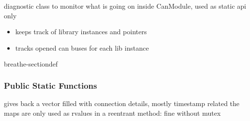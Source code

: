 \documentclass[a4paper,10pt,english]{sphinxmanual}
\begin{document}
\begin{fulllineitems}
\label{\detokenize{classesdetails:_CPPv4N9CanModule4DiagE}}%
\pysigstartmultiline
{}%
\pysigstopmultiline
\sphinxAtStartPar
diagnostic class to monitor what is going on inside CanModule, used as static api only\begin{itemize}
\item {} 
\sphinxAtStartPar
keeps track of library instances and pointers

\item {} 
\sphinxAtStartPar
tracks opened can buses for each lib instance 

\end{itemize}


\begin{sphinxuseclass}{breathe-sectiondef}\subsubsection*{Public Static Functions}

\begin{fulllineitems}
\label{\detokenize{classesdetails:_CPPv4N9CanModule4Diag15get_connectionsEv}}%
\pysigstartmultiline
{}%
\pysigstopmultiline
\sphinxAtStartPar
gives back a vector filled with connection details, mostly timestamp related the maps are only used as rvalues in a reentrant method: fine without mutex 

\end{fulllineitems}


\end{sphinxuseclass}
\end{fulllineitems}
\end{document}
